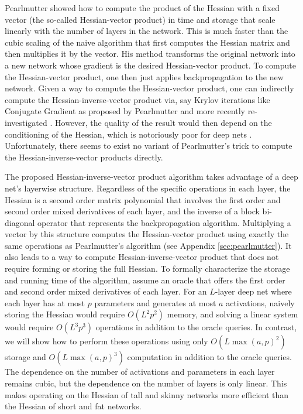 \documentclass{article}
\begin{document}
Pearlmutter \cite{pearlmutter94} showed how to compute the product of the
Hessian with a fixed vector (the so-called Hessian-vector product) in time and
storage that scale linearly with the number of layers in the network.  This is
much faster than the cubic scaling of the naive algorithm that first computes
the Hessian matrix and then multiplies it by the vector.  His method transforms
the original network into a new network whose gradient is the desired
Hessian-vector product. To compute the Hessian-vector product, one then just
applies backpropagation to the new network.  Given a way to compute the
Hessian-vector product, one can indirectly compute the Hessian-inverse-vector
product via, say Krylov iterations like Conjugate Gradient as proposed by
Pearlmutter and more recently re-investigated \cite{martens-hessian-free, krylov-subspace-descent}. However,
the quality of the result would then depend on the conditioning of the Hessian,
which is notoriously poor for deep nets \cite{ying-behrooz-hessian-spectrum}.
Unfortunately, there seems to exist no variant of Pearlmutter's trick to compute
the Hessian-inverse-vector products directly.

The proposed Hessian-inverse-vector product algorithm takes advantage of a deep
net's layerwise structure.  Regardless of the specific operations in each layer,
the Hessian is a second order matrix polynomial that involves the first order
and second order mixed derivatives of each layer, and the inverse of a block
bi-diagonal operator that represents the backpropagation algorithm.  Multiplying
a vector by this structure computes the Hessian-vector product using exactly the
same operations as Pearlmutter's algorithm (see Appendix \ref{sec:pearlmutter}).
It also leads to a way to compute Hessian-inverse-vector product that does not
require forming or storing the full Hessian. To formally characterize the
storage and running time of the algorithm, assume an oracle that offers the
first order and second order mixed derivatives of each layer.  For an $L$-layer
deep net where each layer has at most $p$ parameters and generates at most $a$
activations, naively storing the Hessian would require $O(L^2p^2)$ memory, and
solving a linear system would require $O\left(L^3p^3\right)$ operations in
addition to the oracle queries. In contrast, we will show how to perform these
operations using only $O(L \max(a, p)^2)$ storage and $O(L \max(a, p)^3)$
computation in addition to the oracle queries. The dependence on the number of
activations and parameters in each layer remains cubic, but the dependence on
the number of layers is only linear. This makes operating on the Hessian of tall
and skinny networks more efficient than the Hessian of short and fat networks.
\end{document}
